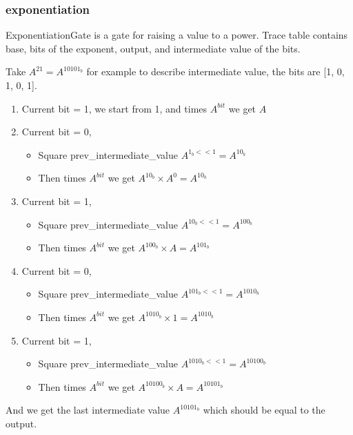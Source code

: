 \subsubsection{exponentiation}

ExponentiationGate is a gate for raising a value to a power. Trace table contains base, bits of the exponent, output, and intermediate value of the bits.

Take $A^{21} = A^{10101_b}$ for example to describe intermediate value, the bits are [1, 0, 1, 0, 1].

\begin{enumerate}
    \item Current bit = 1, we start from 1, and times $A^{bit}$ we get $A$
    \item Current bit = 0,
    \begin{itemize}
        \item Square prev\_intermediate\_value $A^{1_b << 1} = A^{10_b}$
        \item Then times $A^{bit}$ we get $A^{10_b} \times A^0 = A^{10_b}$
    \end{itemize}
    \item Current bit = 1,
    \begin{itemize}
        \item Square prev\_intermediate\_value $A^{10_b << 1} = A^{100_b}$
        \item Then times $A^{bit}$ we get $A^{100_b} \times A = A^{101_b}$
    \end{itemize}
    \item Current bit = 0,
    \begin{itemize}
        \item Square prev\_intermediate\_value $A^{101_b << 1} = A^{1010_b}$
        \item Then times $A^{bit}$ we get $A^{1010_b} \times 1 = A^{1010_b}$
    \end{itemize}
    \item Current bit = 1,
    \begin{itemize}
        \item Square prev\_intermediate\_value $A^{1010_b << 1} = A^{10100_b}$
        \item Then times $A^{bit}$ we get $A^{10100_b} \times A = A^{10101_b}$
    \end{itemize}
\end{enumerate}

And we get the last intermediate value $A^{10101_b}$ which should be equal to the output.

